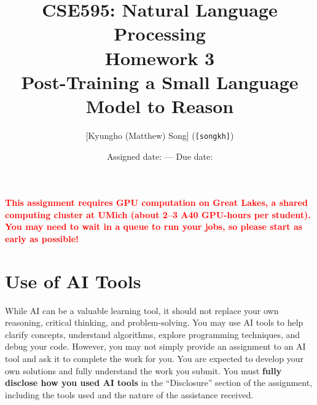 \documentclass[11pt]{article}
\title{CSE595: Natural Language Processing\\Homework 3\\[0.3em]
\large Post-Training a Small Language Model to Reason}
\author{[Kyungho (Matthew) Song] (\texttt{[songkh]})}
\date{Assigned date: \assigneddate{} --- Due date: \duedate}
\begin{document}
\maketitle

\noindent\textcolor{red}{\textbf{This assignment requires GPU computation on Great Lakes, a shared computing cluster at
UMich (about 2--3 A40 GPU-hours per student). You may need to wait in a queue to run your jobs, so please
start as early as possible!}}

\section*{Use of AI Tools}
While AI can be a valuable learning tool, it should not replace your own reasoning, critical thinking, and
problem-solving. You may use AI tools to help clarify concepts, understand algorithms, explore programming
techniques, and debug your code. However, you may not simply provide an assignment to an AI tool and ask it to
complete the work for you. You are expected to develop your own solutions and fully understand the work you
submit. You must \textbf{fully disclose how you used AI tools} in the ``Disclosure'' section of the assignment, including
the tools used and the nature of the assistance received.
\end{document}
